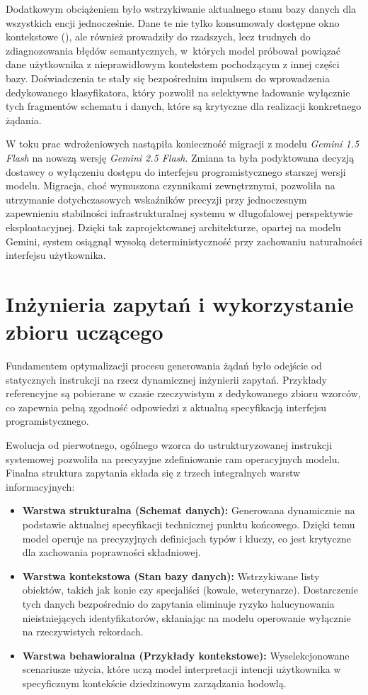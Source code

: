 Dodatkowym obciążeniem było wstrzykiwanie aktualnego stanu bazy danych dla wszystkich encji jednocześnie. Dane te nie tylko konsumowały dostępne okno kontekstowe (), ale również prowadziły do rzadszych, lecz trudnych do zdiagnozowania błędów semantycznych, w~których model próbował powiązać dane użytkownika z nieprawidłowym kontekstem pochodzącym z innej części bazy. Doświadczenia te stały się bezpośrednim impulsem do wprowadzenia dedykowanego klasyfikatora, który pozwolił na selektywne ładowanie wyłącznie tych fragmentów schematu i danych, które są krytyczne dla realizacji konkretnego żądania.

W toku prac wdrożeniowych nastąpiła konieczność migracji z modelu \textit{Gemini 1.5 Flash} na nowszą wersję \textit{Gemini 2.5 Flash}. Zmiana ta była podyktowana decyzją dostawcy o wyłączeniu dostępu do interfejsu programistycznego starszej wersji modelu. Migracja, choć wymuszona czynnikami zewnętrznymi, pozwoliła na utrzymanie dotychczasowych wskaźników precyzji przy jednoczesnym zapewnieniu stabilności infrastrukturalnej systemu w długofalowej perspektywie eksploatacyjnej. Dzięki tak zaprojektowanej architekturze, opartej na modelu Gemini, system osiągnął wysoką deterministyczność przy zachowaniu naturalności interfejsu użytkownika.


\section{Inżynieria zapytań i wykorzystanie zbioru uczącego}

Fundamentem optymalizacji procesu generowania żądań było odejście od statycznych instrukcji na rzecz dynamicznej inżynierii zapytań. Przykłady referencyjne są pobierane w czasie rzeczywistym z dedykowanego zbioru wzorców, co zapewnia pełną zgodność odpowiedzi z aktualną specyfikacją interfejsu programistycznego.

Ewolucja od pierwotnego, ogólnego wzorca do ustrukturyzowanej instrukcji systemowej pozwoliła na precyzyjne zdefiniowanie ram operacyjnych modelu. Finalna struktura zapytania składa się z trzech integralnych warstw informacyjnych:
\begin{itemize}
    \item \textbf{Warstwa strukturalna (Schemat danych):} Generowana dynamicznie na podstawie aktualnej specyfikacji technicznej punktu końcowego. Dzięki temu model operuje na precyzyjnych definicjach typów i kluczy, co jest krytyczne dla zachowania poprawności składniowej.
    \item \textbf{Warstwa kontekstowa (Stan bazy danych):} Wstrzykiwane listy obiektów, takich jak konie czy specjaliści (kowale, weterynarze). Dostarczenie tych danych bezpośrednio do zapytania eliminuje ryzyko halucynowania nieistniejących identyfikatorów, skłaniając na modelu operowanie wyłącznie na rzeczywistych rekordach. %
    \item \textbf{Warstwa behawioralna (Przykłady kontekstowe):} Wyselekcjonowane scenariusze użycia, które uczą model interpretacji intencji użytkownika w specyficznym kontekście dziedzinowym zarządzania hodowlą.
\end{itemize}

